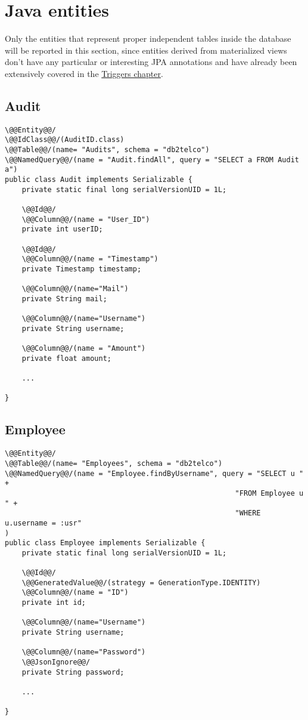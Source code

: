 \section{Java entities}
\label{sec:java_ent}

Only the entities that represent proper independent tables inside the database will be reported in this section, since entities derived from materialized views don't have any particular or interesting JPA annotations and have already been extensively covered in the \hyperref[chap:views_triggers]{Triggers chapter}.

\subsection*{Audit}

\begin{lstlisting}[style = JPA]
\@@Entity@@/
\@@IdClass@@/(AuditID.class)
\@@Table@@/(name= "Audits", schema = "db2telco")
\@@NamedQuery@@/(name = "Audit.findAll", query = "SELECT a FROM Audit a")
public class Audit implements Serializable {
    private static final long serialVersionUID = 1L;

    \@@Id@@/
    \@@Column@@/(name = "User_ID")
    private int userID;

    \@@Id@@/
    \@@Column@@/(name = "Timestamp")
    private Timestamp timestamp;

    \@@Column@@/(name="Mail")
    private String mail;

    \@@Column@@/(name="Username")
    private String username;

    \@@Column@@/(name = "Amount")
    private float amount;

    ...

}
\end{lstlisting}

\subsection*{Employee}

\begin{lstlisting}[style = JPA]
\@@Entity@@/
\@@Table@@/(name= "Employees", schema = "db2telco")
\@@NamedQuery@@/(name = "Employee.findByUsername", query = "SELECT u " + 
                                                      "FROM Employee u " + 
                                                      "WHERE u.username = :usr"
)
public class Employee implements Serializable {
    private static final long serialVersionUID = 1L;

    \@@Id@@/
    \@@GeneratedValue@@/(strategy = GenerationType.IDENTITY)
    \@@Column@@/(name = "ID")
    private int id;

    \@@Column@@/(name="Username")
    private String username;

    \@@Column@@/(name="Password")
    \@@JsonIgnore@@/
    private String password;

    ...

}
\end{lstlisting}

